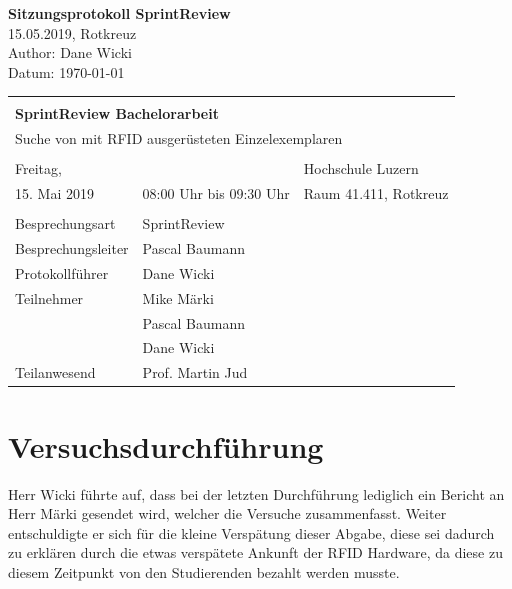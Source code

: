 \documentclass[parskip=full, a4paper]{scrreprt}
\begin{document}
\begin{titlepage}
\vspace*{2.5cm}
\noindent
\Huge{\textbf{Sitzungsprotokoll SprintReview}} \\
\noindent
\Large{15.05.2019, Rotkreuz}\\
\vfill
\noindent
\large{Author: Dane Wicki}\\
\noindent
\large{Datum: \today}\\
\end{titlepage}

\noindent
\begin{tabularx}{\textwidth}{XXl}
\hline \\
\multicolumn{3}{l}{\Large{\textbf{SprintReview  Bachelorarbeit}}}\\
\multicolumn{3}{l}{Suche von mit RFID ausgerüsteten Einzelexemplaren} \\ \\
\hline
	Freitag, & & Hochschule Luzern \\
	15. Mai 2019 & 08:00 Uhr bis 09:30 Uhr & Raum 41.411, Rotkreuz \\
\hline \\
\hline
Besprechungsart & SprintReview & \\
\hline
Besprechungsleiter & Pascal Baumann & \\
\hline
Protokollführer & Dane Wicki & \\
\hline
Teilnehmer & Mike Märki & \\ & Pascal Baumann & \\ & Dane Wicki & \\
\hline
Teilanwesend & Prof. Martin Jud & \\
\hline
\end{tabularx}

	\noindent

\tableofcontents
\clearpage
\chapter{Versuchsdurchführung}
Herr Wicki führte auf, dass bei der letzten Durchführung lediglich ein Bericht an Herr Märki gesendet wird, welcher die Versuche zusammenfasst.
Weiter entschuldigte er sich für die kleine Verspätung dieser Abgabe, diese sei dadurch zu erklären durch die etwas verspätete Ankunft der RFID Hardware, da diese zu diesem Zeitpunkt von den Studierenden bezahlt werden musste.
\end{document}
